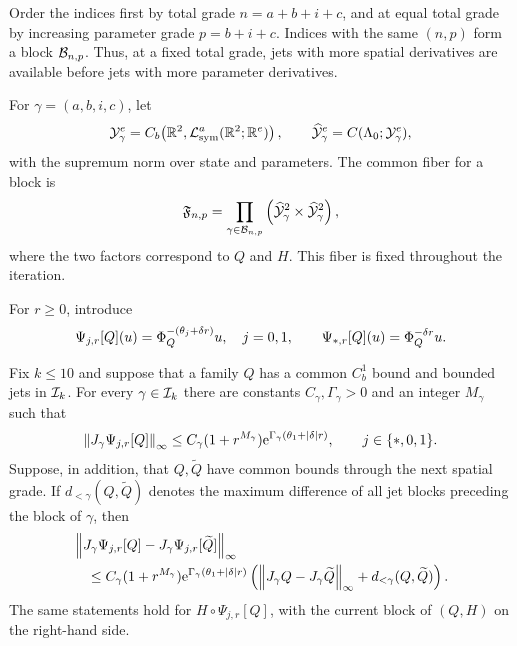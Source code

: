 Order the indices first by total grade \(n=a+b+i+c\), and at equal total
grade by increasing parameter grade \(p=b+i+c\).  Indices with the same
\((n,p)\) form a block \(\mathcal B_{n,p}\).  Thus, at a fixed total grade, jets
with more spatial derivatives are available before jets with more parameter
derivatives.

For \(\gamma=(a,b,i,c)\), let
\begin{equation}
\label{eq:app-jet-spaces}
 \mathcal Y_\gamma^e
 =C_b\!\left(\mathbb R^2,
     \mathcal L_{\rm sym}^a(\mathbb R^2;\mathbb R^e)\right),
 \qquad
 \widehat{\mathcal Y}_\gamma^e
 =C(\Lambda_0;\mathcal Y_\gamma^e),
\end{equation}
with the supremum norm over state and parameters.  The common fiber for a
block is
\begin{equation}
\label{eq:app-common-fiber}
 \mathfrak F_{n,p}
 =\prod_{\gamma\in\mathcal B_{n,p}}
   \left(\widehat{\mathcal Y}_\gamma^2
         \times\widehat{\mathcal Y}_\gamma^2\right),
\end{equation}
where the two factors correspond to \(Q\) and \(H\).  This fiber is fixed
throughout the iteration.

For \(r\geq0\), introduce
\begin{equation}
\label{eq:app-flow-compositions}
 \Psi_{j,r}[Q](u)=\Phi_Q^{-(\theta_j+\delta r)}u,
 \quad j=0,1,
 \qquad
 \Psi_{*,r}[Q](u)=\Phi_Q^{-\delta r}u.
\end{equation}

\begin{lemma}
\label{lem:app-triangular-flow-jets}
Fix \(k\leq10\) and suppose that a family \(Q\) has a common \(C_b^1\)
bound and bounded jets in \(\mathcal I_k\).  For every
\(\gamma\in\mathcal I_k\) there are constants \(C_\gamma,\Gamma_\gamma>0\)
and an integer \(M_\gamma\) such that
\begin{equation}
\label{eq:app-flow-jet-bound}
 \left\lVert J_\gamma\Psi_{j,r}[Q]\right\rVert_\infty
 \leq C_\gamma(1+r^{M_\gamma})
 \mathrm e^{\Gamma_\gamma(\theta_1+\left\lvert \delta\right\rvert r)},
 \qquad j\in\{*,0,1\}.
\end{equation}
Suppose, in addition, that \(Q,\widetilde Q\) have common bounds through
the next spatial grade.  If \(d_{<\gamma}(Q,\widetilde Q)\) denotes the
maximum difference of all jet blocks preceding the block of \(\gamma\),
then
\begin{align}
\label{eq:app-flow-jet-difference}
 &\left\lVert J_\gamma\Psi_{j,r}[Q]
       -J_\gamma\Psi_{j,r}[\widetilde Q]\right\rVert_\infty\notag\\
 &\quad\leq C_\gamma(1+r^{M_\gamma})
 \mathrm e^{\Gamma_\gamma(\theta_1+\left\lvert \delta\right\rvert r)}
 \left(
  \left\lVert J_\gamma Q-J_\gamma\widetilde Q\right\rVert_\infty
  +d_{<\gamma}(Q,\widetilde Q)
 \right).
\end{align}
The same statements hold for \(H\circ\Psi_{j,r}[Q]\), with the current
block of \((Q,H)\) on the right-hand side.
\end{lemma}

